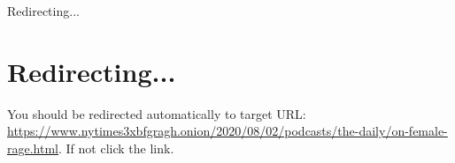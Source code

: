 Redirecting...

\hypertarget{redirecting}{%
\section{Redirecting...}\label{redirecting}}

You should be redirected automatically to target URL:
\url{https://www.nytimes3xbfgragh.onion/2020/08/02/podcasts/the-daily/on-female-rage.html}.
If not click the link.
